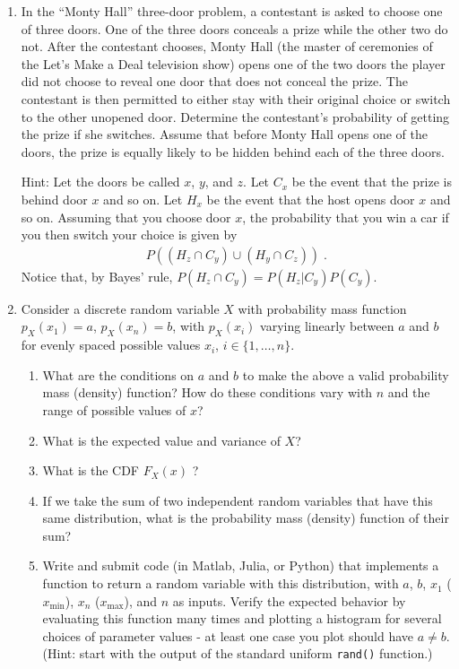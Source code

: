 \documentclass[letterpaper,12pt]{article}
\begin{document}
\begin{enumerate}
\item
In the ``Monty Hall'' three-door problem, a contestant is asked to choose one of three doors. One of the three doors conceals a prize while the other two do not. After the contestant chooses, Monty Hall (the master of ceremonies of the Let's Make a Deal television show) opens one of the two doors the player did not choose to reveal one door that does not conceal the prize. The contestant is then permitted to either stay with their original choice or switch to the other unopened door. Determine the contestant's probability of getting the prize if she switches. Assume that before Monty Hall opens one of the doors, the prize is equally likely to be hidden behind each of the three doors.

Hint: Let the doors be called $x$, $y$, and $z$. Let $C_x$ be the event that the prize is behind door $x$ and so on. Let $H_x$ be the event that the host opens door $x$ and so on. Assuming that you choose door $x$, the probability that you win a car if you then switch your choice is given by
\begin{align*}
    P((H_z \cap C_y) \cup (H_y \cap C_z)) \; .
\end{align*}
Notice that, by Bayes' rule, $P(H_z \cap C_y) = P(H_z|C_y) P(C_y)$.




\item
Consider a discrete random variable $X$ with probability mass function $p_X(x_1) = a$, $p_X(x_n) = b$, with $p_X(x_i)$ varying linearly between $a$ and $b$ for evenly spaced possible values $x_i$, $i \in \{1, \ldots, n\}$.

\begin{enumerate}
\item What are the conditions on $a$ and $b$ to make the above a valid probability mass (density) function? How do these conditions vary with $n$ and the range of possible values of $x$?
\item What is the expected value and variance of $X$?
\item What is the CDF $F_X(x)$ ?
\item If we take the sum of two independent random variables that have this same distribution, what is the probability mass (density) function of their sum?
\item Write and submit code (in Matlab, Julia, or Python) that implements a function to return a random variable with this distribution, with $a$, $b$, $x_1$ ($x_{\min}$), $x_n$ ($x_{\max}$), and $n$ as inputs. Verify the expected behavior by evaluating this function many times and plotting a histogram for several choices of parameter values - at least one case you plot should have $a \neq b$. (Hint: start with the output of the standard uniform \texttt{rand()} function.)
\end{enumerate}


\end{enumerate}
\end{document}
